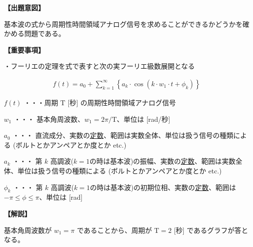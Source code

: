\noindent \textbf{【出題意図】}

\noindent 基本波の式から周期性時間領域アナログ信号を求めることができるかどうかを確かめる問題である。

\vspace{1em}
\noindent \textbf{【重要事項】}

\medskip
\noindent ・フーリエの定理を式で表すと次の実フーリエ級数展開となる

\begin{align*}
f(t) = a_0 + \sum_{k=1}^{\infty}
\left \{
a_k \cdot \cos (k \cdot w_1 \cdot t + \phi_k)
\right \}
\end{align*}

\medskip
\noindent $f(t)$ ・・・周期 $\textrm{T}$ [秒] の周期性時間領域アナログ信号

\medskip
\noindent $w_1$ ・・・ 基本角周波数、$w_1 = 2\pi/\textrm{T}$、単位は [rad/秒]

\medskip
\noindent $a_0$ ・・・ 直流成分、実数の\underline{定数}、範囲は実数全体、単位は扱う信号の種類による (ボルトとかアンペアとか度とか etc.)

\medskip
\noindent $a_k$ ・・・ 第 $k$ 高調波($k=1$の時は基本波)の振幅、実数の\underline{定数}、範囲は実数全体、単位は扱う信号の種類による (ボルトとかアンペアとか度とか etc.)

\medskip
\noindent $\phi_k$ ・・・ 第 $k$ 高調波($k=1$の時は基本波)の初期位相、実数の\underline{定数}、範囲は $-\pi \leq \phi \leq \pi$、単位は [rad]


\vspace{1em}
\noindent \textbf{【解説】}

\noindent 基本角周波数が $w_1 = \pi$ であることから、周期が $\textrm{T} = 2$ [秒] であるグラフが答となる。
